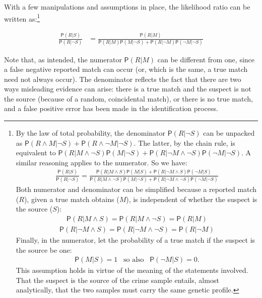 \documentclass[
  letterpaper,
  DIV=11,
  numbers=noendperiod]{scrartcl}
\newcommand{\n}{\neg}
\newcommand{\et}{\wedge}
\newcommand{\pr}[1]{\mathsf{P}(#1)}
\begin{document}
\noindent With a few manipulations and assumptions in place, the
likelihood ratio can be written as:\footnote{By the law of total
  probability, the denominator \(\pr{R \vert \neg S}\) can be unpacked
  as \(\pr{R \wedge M \vert \neg S} + \pr{R \wedge \neg M | \neg S}\).
  The latter, by the chain rule, is equivalent to
  \(\pr{R \vert M \wedge \neg S}\pr{ M \vert \n S} + \pr{R \vert \n M \wedge \neg S}\pr{\n M \vert \n S}\).
  A similar reasoning applies to the numerator. So we have:
  \begin{align*} 
  \frac{\pr{R \vert S}}{\pr{R \vert \neg S}} = \frac{\pr{R \vert M \et S}\pr{M \vert S} + \pr{R \vert \n M \et S}\pr{\n M \vert S}} {\pr{R \vert M \et \n S}\pr{M \vert \n S} + \pr{R \vert \n M \et \n S}\pr{\n M \vert \n S}}
  \end{align*} Both numerator and denominator can be simplified because
  a reported match (\(R\)), given a true match obtains (\(M\)), is
  independent of whether the suspect is the source (\(S\)):
  \begin{align*} 
  \pr{R \vert M \et S} = \pr{R \vert M \et \n S} = \pr{R \vert M}
  \end{align*} \begin{align*} 
  \pr{R \vert \n M \et S} = \pr{R \vert\n M \et \n S} = \pr{R \vert \n M} 
  \end{align*} Finally, in the numerator, let the probability of a true
  match if the suspect is the source be one: \begin{align*} 
  \pr{M\vert S} = 1  \,\,\, \mbox{ so also } \,\,\, \pr{\n M \vert S}=0. 
  \end{align*} This assumption holds in virtue of the meaning of the
  statements involved. That the suspect is the source of the crime
  sample entails, almost analytically, that the two samples must carry
  the same genetic profile.}

\begin{align}
\label{eq:LRfp4}
\frac{\pr{R \vert S}}{\pr{R \vert \neg S}} & = \frac{
\pr{R \vert M}
}{
\pr{R \vert M }\pr{M \vert \n S} +
\pr{R \vert \n M}\pr{\n M \vert \n S}
}
\end{align}

\noindent Note that, as intended, the numerator \(\pr{R \vert M}\) can
be different from one, since a false negative reported match can occur
(or, which is the same, a true match need not always occur). The
denominator reflects the fact that there are two ways misleading
evidence can arise: there is a true match and the suspect is not the
source (because of a random, coincidental match), or there is no true
match, and a false positive error has been made in the identification
process.
\end{document}
